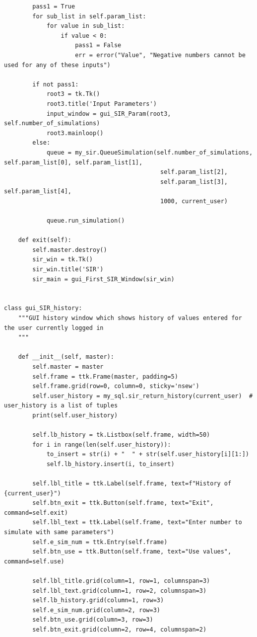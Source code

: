 \documentclass[11pt, a4paper]{article}
\begin{document}
\begin{lstlisting}
        pass1 = True
        for sub_list in self.param_list:
            for value in sub_list:
                if value < 0:
                    pass1 = False
                    err = error("Value", "Negative numbers cannot be used for any of these inputs")

        if not pass1:
            root3 = tk.Tk()
            root3.title('Input Parameters')
            input_window = gui_SIR_Param(root3, self.number_of_simulations)
            root3.mainloop()
        else:
            queue = my_sir.QueueSimulation(self.number_of_simulations, self.param_list[0], self.param_list[1],
                                            self.param_list[2],
                                            self.param_list[3], self.param_list[4],
                                            1000, current_user)

            queue.run_simulation()

    def exit(self):
        self.master.destroy()
        sir_win = tk.Tk()
        sir_win.title('SIR')
        sir_main = gui_First_SIR_Window(sir_win)


class gui_SIR_history:
    """GUI history window which shows history of values entered for the user currently logged in
    """

    def __init__(self, master):
        self.master = master
        self.frame = ttk.Frame(master, padding=5)
        self.frame.grid(row=0, column=0, sticky='nsew')
        self.user_history = my_sql.sir_return_history(current_user)  # user_history is a list of tuples
        print(self.user_history)

        self.lb_history = tk.Listbox(self.frame, width=50)
        for i in range(len(self.user_history)):
            to_insert = str(i) + "  " + str(self.user_history[i][1:])
            self.lb_history.insert(i, to_insert)

        self.lbl_title = ttk.Label(self.frame, text=f"History of {current_user}")
        self.btn_exit = ttk.Button(self.frame, text="Exit", command=self.exit)
        self.lbl_text = ttk.Label(self.frame, text="Enter number to simulate with same parameters")
        self.e_sim_num = ttk.Entry(self.frame)
        self.btn_use = ttk.Button(self.frame, text="Use values", command=self.use)

        self.lbl_title.grid(column=1, row=1, columnspan=3)
        self.lbl_text.grid(column=1, row=2, columnspan=3)
        self.lb_history.grid(column=1, row=3)
        self.e_sim_num.grid(column=2, row=3)
        self.btn_use.grid(column=3, row=3)
        self.btn_exit.grid(column=2, row=4, columnspan=2)


\end{lstlisting}
\end{document}

